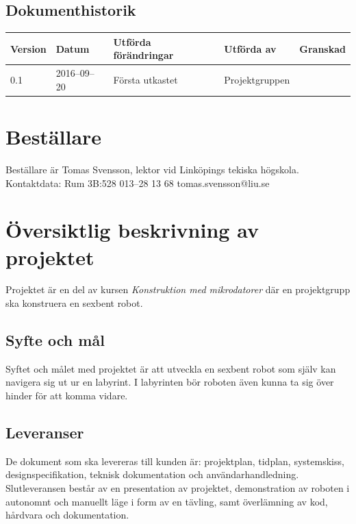 \documentclass[a4paper,titlepage,12pt]{article}
\begin{document}
\begin{center}

		\section*{Dokumenthistorik}
		\renewcommand*{\arraystretch}{1.4}
		\begin{longtable}[c]{ l l l l l }
			\textbf{Version} & \textbf{Datum} & \textbf{Utförda förändringar} 
			& \textbf{Utförda av} & \textbf{Granskad} \\ \midrule

			0.1 & 2016--09--20 & Första utkastet & Projektgruppen & \\
		\end{longtable}
	\end{center}

	\newpage

	\section{Beställare}
	Beställare är Tomas Svensson, lektor vid Linköpings tekiska högskola. \\
  Kontaktdata: Rum 3B:528 013–28 13 68 tomas.svensson@liu.se


	\section{Översiktlig beskrivning av projektet}
	Projektet är en del av kursen \textit{Konstruktion med mikrodatorer} där en
  projektgrupp ska konstruera en sexbent robot. 

	\subsection{Syfte och mål}
	Syftet och målet med projektet är att utveckla en sexbent robot som själv
	kan navigera sig ut ur en labyrint. I labyrinten bör roboten även kunna ta
	sig över hinder för att komma vidare.

	
	\subsection{Leveranser}
	De dokument som ska levereras till kunden är: projektplan, tidplan,
	systemskiss, designspecifikation, teknisk dokumentation och
	användarhandledning. Slutleveransen består av en presentation av projektet,
	demonstration av roboten i autonomnt och manuellt läge i form av en tävling,
	samt överlämning av kod, hårdvara och dokumentation.
	
\end{document}
